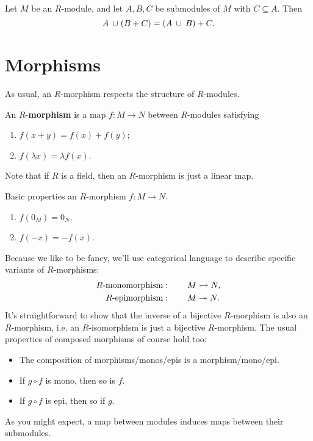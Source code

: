 \documentclass[twoside,10pt]{report}
\begin{document}
\begin{thrm}
Let $M$ be an $R$-module, and let $A,B,C$ be submodules of $M$ with $C \subseteq A$. Then
\[
	A \operatorname{\;\cup\;} (B+C) = (A\operatorname{\;\cup\;} B) + C.
\] 
\end{thrm}

\section{Morphisms}

As usual, an $R$-morphism respects the structure of $R$-modules.
\begin{defn}[]
An $R$-\textbf{morphism} is a map $f:M\to N$ between $R$-modules satisfying
\begin{enumerate}
	\item $f(x+y) = f(x) + f(y)$;
	\item $f(\lambda x) = \lambda f(x)$.
\end{enumerate}
\end{defn}

Note that if $R$ is a field, then an $R$-morphism is just a linear map.

\begin{prop}
Basic properties an $R$-morphism $f:M\to N$.
\begin{enumerate}
	\item $f(0_{M})=0_{N}$.
	\item $f(-x)=-f(x)$.
\end{enumerate}
\end{prop}

Because we like to be fancy, we'll use categorical language to describe specific variants of $R$-morphisms:
\begin{align*}
	R\text{-monomorphism}&: \quad\quad M \rightarrowtail N,\\
	R\text{-epimorphism}&: \quad\quad M \twoheadrightarrow N.
\end{align*}
It's straightforward to show that the inverse of a bijective $R$-morphism is also an $R$-morphism, i.e. an $R$-isomorphism is just a bijective $R$-morphism. The usual properties of composed morphisms of course hold too:
\begin{itemize}
	\item The composition of morphisms/monos/epis is a morphism/mono/epi.
	\item If $g \circ f$ is mono, then so is $f$.
	\item If $g \circ f$ is epi, then so if $g$.
\end{itemize}
As you might expect, a map between modules induces maps between their submodules.
\end{document}
